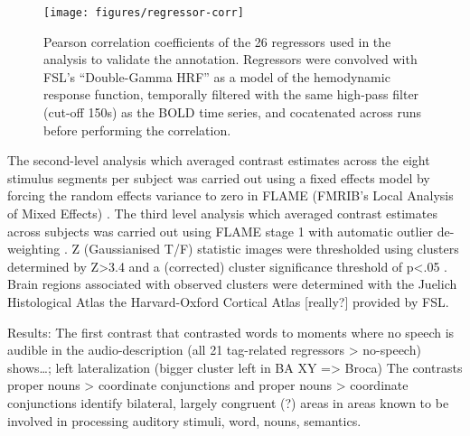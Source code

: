 \documentclass[10pt,a4paper,onecolumn]{article}
\begin{document}
\begin{figure*}
  \centering
  \texttt{[image: figures/regressor-corr]}
  \caption{Pearson correlation coefficients of the 26 regressors used in the analysis to validate the annotation. Regressors were convolved with FSL's ``Double-Gamma HRF'' as a model of the hemodynamic response function, temporally filtered with the same high-pass filter (cut-off 150s) as the BOLD time series, and cocatenated across runs before performing the correlation.}
\label{fig:reg-corr}
\end{figure*}



The second-level analysis which averaged contrast estimates across the eight stimulus segments per subject was carried out using a fixed effects model by forcing the random effects variance to zero in FLAME (FMRIB’s Local Analysis of Mixed Effects) \citep{beckmann2003general, woolrich2004multilevel}. The third level analysis which averaged contrast estimates across subjects was carried out using FLAME stage 1 with automatic outlier de-weighting \citep{beckmann2003general, woolrich2004multilevel, woolrich2008robust}.
Z (Gaussianised T/F) statistic images were thresholded using clusters determined by Z>3.4 and a (corrected) cluster significance threshold of p<.05 \citep{woolrich2008robust}. Brain regions associated with observed clusters were determined with the Juelich Histological Atlas \citep{eickhoff2005toolbox,eickhoff2007assignment} the Harvard-Oxford Cortical Atlas \citep{desikan2006automated}[really?] provided by FSL.

Results: The first contrast that contrasted words to moments where no speech is audible in the audio-description (all 21 tag-related regressors > no-speech) shows\dots;
left lateralization (bigger cluster left in BA XY => Broca)
The contrasts proper nouns > coordinate conjunctions and proper nouns > coordinate conjunctions identify bilateral, largely congruent (?) areas in areas known to be involved in processing auditory stimuli, word, nouns, semantics.
\end{document}
